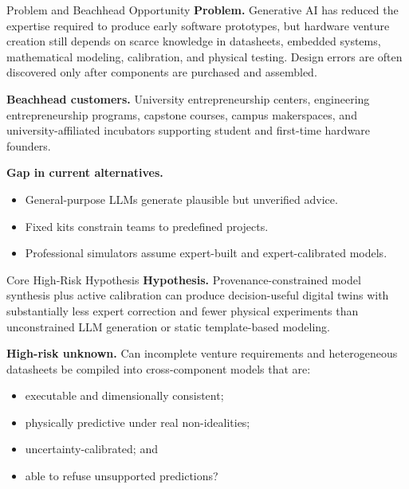 \documentclass[a4paper,10pt]{article}
\begin{document}
\begin{minipage}[t]{0.49\textwidth}
\begin{vmBox}{Problem and Beachhead Opportunity}
\textbf{Problem.} Generative AI has reduced the expertise required to produce early software prototypes, but hardware venture creation still depends on scarce knowledge in datasheets, embedded systems, mathematical modeling, calibration, and physical testing. Design errors are often discovered only after components are purchased and assembled.

\textbf{Beachhead customers.} University entrepreneurship centers, engineering entrepreneurship programs, capstone courses, campus makerspaces, and university-affiliated incubators supporting student and first-time hardware founders.

\textbf{Gap in current alternatives.}
\begin{itemize}
\item General-purpose LLMs generate plausible but unverified advice.
\item Fixed kits constrain teams to predefined projects.
\item Professional simulators assume expert-built and expert-calibrated models.
\end{itemize}
\end{vmBox}
\end{minipage}
\hfill
\begin{minipage}[t]{0.49\textwidth}
\begin{vmBox}{Core High-Risk Hypothesis}
\textbf{Hypothesis.} Provenance-constrained model synthesis plus active calibration can produce decision-useful digital twins with substantially less expert correction and fewer physical experiments than unconstrained LLM generation or static template-based modeling.

\textbf{High-risk unknown.} Can incomplete venture requirements and heterogeneous datasheets be compiled into cross-component models that are:
\begin{itemize}
\item executable and dimensionally consistent;
\item physically predictive under real non-idealities;
\item uncertainty-calibrated; and
\item able to refuse unsupported predictions?
\end{itemize}
\end{vmBox}
\end{minipage}
\end{document}
